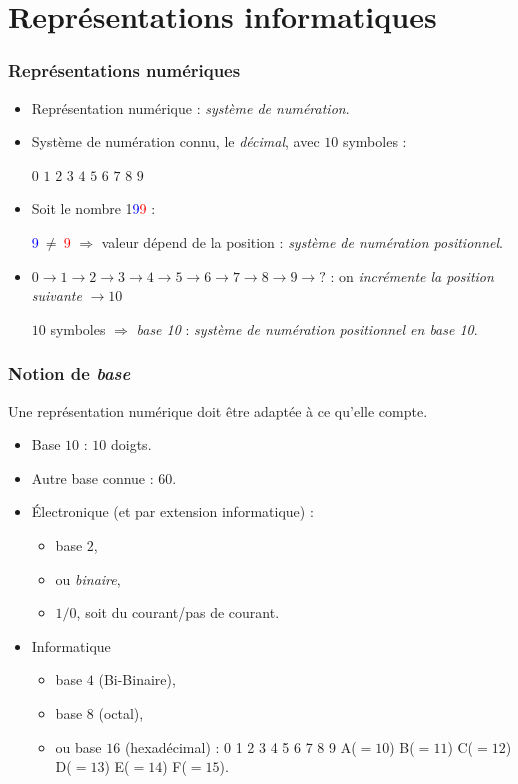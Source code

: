 \section{Repr\'esentations informatiques}

	\frame
	{
		\frametitle{Repr\'esentations num\'eriques}
		\begin{itemize}
			\item<1-> Repr\'esentation num\'erique : \emph{syst\`eme de num\'eration}.
			\item<2-> Syst\`eme de num\'eration connu, le \emph{d\'ecimal}, avec $10$ symboles :
				
			$0$ $1$ $2$ $3$ $4$ $5$ $6$ $7$ $8$ $9$
			\item<3-> Soit le nombre 1\textcolor{blue}{9}\textcolor{red}{9} :
			
			\textcolor{blue}{9}$~\neq~$\textcolor{red}{9}
			$\Rightarrow$ valeur d\'epend de la position : \emph{syst\`eme de num\'eration positionnel}.

			\item<4-> $0 \rightarrow 1\rightarrow  2 \rightarrow 3 \rightarrow 4 \rightarrow 5 \rightarrow 6 \rightarrow 7 \rightarrow 8 \rightarrow 9\rightarrow ?$ : on \emph{incr\'emente la position suivante} $\rightarrow 10$
			
			$10$ symboles $\Rightarrow$ \emph{base 10} : \emph{syst\`eme de num\'eration positionnel en base 10}.
		\end{itemize}
	}
	
	\frame
	{
		\frametitle{Notion de \emph{base}}
		
		Une repr\'esentation num\'erique doit \^etre adapt\'ee \`a ce qu'elle compte.
		\begin{itemize}
			\item<2-> Base $10$ : $10$ doigts.
			\item<3-> Autre base connue :  $60$.
			\item<4-> \'Electronique (et par extension informatique) :
			\begin{itemize}
				\item<5-> base $2$,
				\item<6-> ou \emph{binaire},
				\item<7-> $1/0$, soit du courant/pas de courant.
			\end{itemize}
			\item<8-> Informatique
			\begin{itemize}
				\item<9-> base $4$ (Bi-Binaire),
				\item<10-> base $8$ (octal),
				\item<11-> ou base $16$ (hexad\'ecimal) : 0 1 2 3 4 5 6 7 8 9 A($=10$) B($=11$) C($=12$) D($=13$) E($=14$) F($=15$).
			\end{itemize}
		\end{itemize}
	}
	
